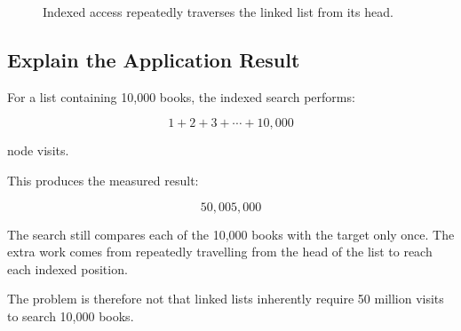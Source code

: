 \documentclass{csc2059practical}
\begin{document}
\begin{figure}[htbp]

    \caption{
        Indexed access repeatedly traverses the linked list from its head.
    }
    \label{fig:indexed-list-repeated-traversal}
\end{figure}


\subsection{Explain the Application Result}

For a list containing 10,000 books, the indexed search performs:

\[
1 + 2 + 3 + \cdots + 10{,}000
\]

node visits.

This produces the measured result:

\[
50{,}005{,}000
\]

The search still compares each of the 10,000 books with the target only once.
The extra work comes from repeatedly travelling from the head of the list to
reach each indexed position.

The problem is therefore not that linked lists inherently require 50 million
visits to search 10,000 books.
\end{document}
